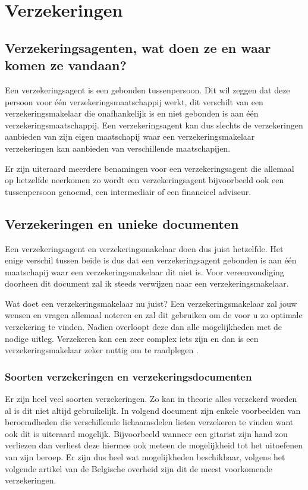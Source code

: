 

\chapter{Verzekeringen}
\label{ch:insurance}
\section{Verzekeringsagenten, wat doen ze en waar komen ze vandaan?}
Een verzekeringsagent is een gebonden tussenpersoon. Dit wil zeggen dat deze persoon voor één verzekeringsmaatschappij werkt, dit verschilt van een verzekeringsmakelaar die onafhankelijk is en niet gebonden is aan één verzekeringsmaatschappij. Een verzekeringsagent kan dus slechts de verzekeringen aanbieden van zijn eigen maatschapij waar een verzekeringsmakelaar verzekeringen kan aanbieden van verschillende maatschapijen. 

Er zijn uiteraard meerdere benamingen voor een verzekeringsagent die allemaal op hetzelfde neerkomen zo wordt een verzekeringsagent bijvoorbeeld ook een tussenpersoon genoemd, een intermediair of een financieel adviseur.

\section{Verzekeringen en unieke documenten}
Een verzekeringsagent en verzekeringsmakelaar doen dus juist hetzelfde. Het enige verschil tussen beide is dus dat een verzekeringsagent gebonden is aan één maatschapij waar een verzekeringsmakelaar dit niet is. Voor vereenvoudiging doorheen dit document zal ik steeds verwijzen naar een verzekeringsmakelaar. 

Wat doet een verzekeringsmakelaar nu juist? Een verzekeringsmakelaar zal jouw wensen en vragen allemaal noteren en zal dit gebruiken om de voor u zo optimale verzekering te vinden. Nadien overloopt deze dan alle mogelijkheden met de nodige uitleg. Verzekeren kan een zeer complex iets zijn en dan is een verzekeringsmakelaar zeker nuttig om te raadplegen  \textcite{Verzekeruzelf.nl}.

\subsection{Soorten verzekeringen en verzekeringsdocumenten}
Er zijn heel veel soorten verzekeringen. Zo kan in theorie alles verzekerd worden al is dit niet altijd gebruikelijk. In volgend document \textcite{verzekeringen.com2015} zijn enkele voorbeelden van beroemdheden die verschillende lichaamsdelen lieten verzekeren te vinden want ook dit is uiteraard mogelijk. Bijvoorbeeld wanneer een gitarist zijn hand zou verliezen dan verliest deze hiermee ook meteen de mogelijkheid tot het uitoefenen van zijn beroep. Er zijn dus heel wat mogelijkheden beschikbaar, volgens het volgende artikel \textcite{BFOverzekeringen} van de Belgische overheid zijn dit de meest voorkomende verzekeringen.

